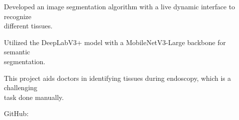 \begin{resume_list}
  \item Developed an image segmentation algorithm with a live dynamic interface to recognize \\
  different tissues.
  \item Utilized the DeepLabV3+ model with a MobileNetV3-Large backbone for semantic \\
  segmentation.
  \item This project aids doctors in identifying tissues during endoscopy, which is a challenging \\
  task done manually.
  \item GitHub: 
\end{resume_list}
